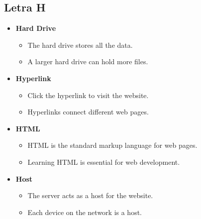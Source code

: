     \subsection{Letra H}
    \begin{itemize}
        \item \textbf{Hard Drive}
        \begin{itemize}
            \item The hard drive stores all the data.
            \item A larger hard drive can hold more files.
        \end{itemize}
        \item \textbf{Hyperlink}
        \begin{itemize}
            \item Click the hyperlink to visit the website.
            \item Hyperlinks connect different web pages.
        \end{itemize}
        \item \textbf{HTML}
        \begin{itemize}
            \item HTML is the standard markup language for web pages.
            \item Learning HTML is essential for web development.
        \end{itemize}
        \item \textbf{Host}
        \begin{itemize}
            \item The server acts as a host for the website.
            \item Each device on the network is a host.
        \end{itemize}
    \end{itemize}

